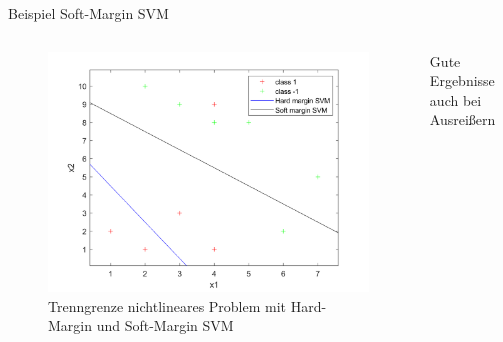 \documentclass[ngerman]{beamer}
\begin{document}
\begin{frame}{Beispiel Soft-Margin SVM}
    \begin{columns}
        \begin{column}{0.8\textwidth}
        \begin{figure}
            \includegraphics[width=\textwidth,height=\textheight,keepaspectratio]{../code/octave/images/svmsimplenotlinear}
            \caption{Trenngrenze nichtlineares Problem mit Hard-Margin und Soft-Margin SVM}
            \label{fig:bspsmsvm}
        \end{figure} \pause
        \end{column}
        \begin{column}{0.2\textwidth}
        Gute Ergebnisse auch bei Ausreißern
            \end{column}
    \end{columns}

\end{frame}
\end{document}
